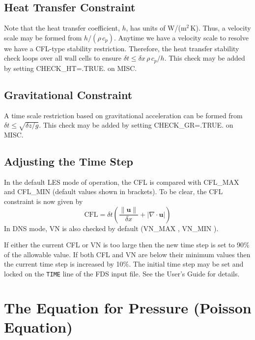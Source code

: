 \subsection{Heat Transfer Constraint}

Note that the heat transfer coefficient, $h$, has units of W/(m$^2$\,K).  Thus, a velocity scale may be formed from $h/(\rho\, c_p)$.  Anytime we have a velocity scale to resolve we have a CFL-type stability restriction.  Therefore, the heat transfer stability check loops over all wall cells to ensure $\delta t \le \delta x \,\rho \,c_p/h$.  This check may be added by setting {\ct CHECK\_HT=.TRUE.} on {\ct MISC}.

\subsection{Gravitational Constraint}

A time scale restriction based on gravitational acceleration can be formed from $\delta t \le \sqrt{\delta z/g}$.  This check may be added by setting  {\ct CHECK\_GR=.TRUE.} on {\ct MISC}.

\subsection{Adjusting the Time Step}

In the default LES mode of operation, the CFL is compared with {\ct CFL\_MAX \![1.0]} and {\ct CFL\_MIN \![0.8]} (default values shown in brackets).  To be clear, the CFL constraint is now given by
\begin{equation}
\mbox{CFL} = \delta t \left( \frac{\|\mathbf{u}\|}{\delta x} + |\nabla\cdot\mathbf{u}| \right)
\end{equation}
In DNS mode, VN is also checked by default ({\ct VN\_MAX \![0.5]}, {\ct VN\_MIN \![0.4]}).

If either the current CFL or VN is too large then the new time step is set to 90\% of the allowable value.  If both CFL and VN are below their minimum values then the current time step is increased by 10\%.  The initial time step may be set and locked on the {\tt TIME} line of the FDS input file.  See the User's Guide for details.


\clearpage
\section{The Equation for Pressure (Poisson Equation)}

